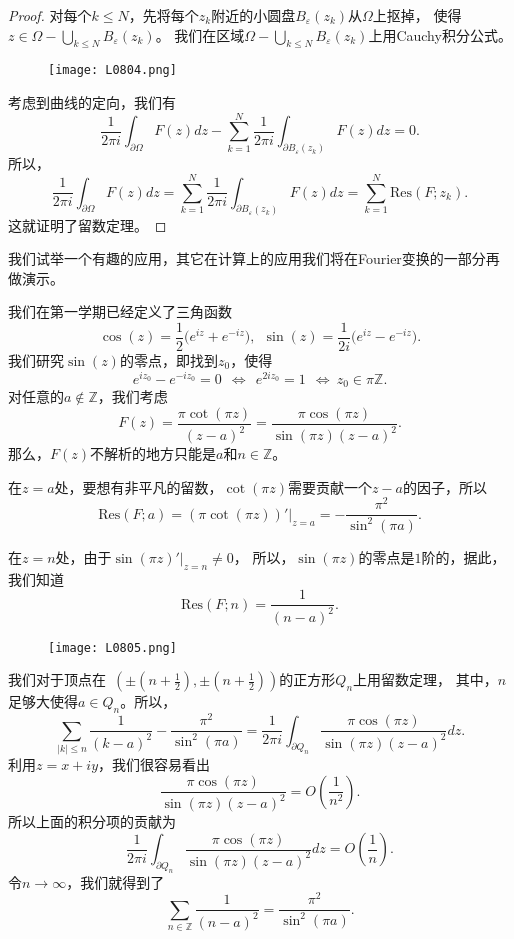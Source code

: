 \begin{proof}
对每个$k\leqslant N$，先将每个$z_k$附近的小圆盘$B_{\varepsilon}(z_k)$从$\Omega$上抠掉，
使得$z\in \Omega-\bigcup_{k\leqslant N}B_\varepsilon(z_k)$。
我们在区域$\Omega-\bigcup_{k\leqslant N}B_\varepsilon(z_k)$上用Cauchy积分公式。
\begin{figure}[H]
    \centering
    \texttt{[image: L0804.png]}
    \caption{}
\end{figure}
考虑到曲线的定向，我们有
\[\frac{1}{2\pi i}\int_{\partial \Omega} {F(z)}dz-\sum_{k=1}^N\frac{1}{2\pi i}\int_{\partial B_{\varepsilon}(z_k)} {F(z)}dz=0.
\]
所以，
\[\frac{1}{2\pi i}\int_{\partial \Omega} {F(z)}dz=\sum_{k=1}^N\frac{1}{2\pi i}\int_{\partial B_{\varepsilon}(z_k)} {F(z)}dz=\sum_{k=1}^N\textrm{Res}(F;z_k).
\]
这就证明了留数定理。
\end{proof}

我们试举一个有趣的应用，其它在计算上的应用我们将在Fourier变换的一部分再做演示。
\begin{example}
我们在第一学期已经定义了三角函数
\[\cos(z)=\frac{1}{2}\big(e^{iz}+e^{-iz}\big),\ \ \sin(z)=\frac{1}{2i}\big(e^{iz}-e^{-iz}\big).\]
我们研究$\sin(z)$的零点，即找到$z_0$，使得
\[e^{iz_0}-e^{-iz_0}=0 \ \ \Leftrightarrow \ \ e^{2iz_0}=1 \ \ \Leftrightarrow \ z_0\in \pi\mathbb{Z}.\]
对任意的$a\notin \mathbb{Z}$，我们考虑
\[F(z)=\frac{\pi\cot(\pi z)}{(z-a)^2}=\frac{\pi\cos(\pi z)}{\sin(\pi z)(z-a)^2}.\]
那么，$F(z)$不解析的地方只能是$a$和$n\in \mathbb{Z}$。

在$z=a$处，要想有非平凡的留数，$\cot(\pi z)$需要贡献一个$z-a$的因子，所以
\[\textrm{Res}(F;a)=(\pi \cot(\pi z))'|_{z=a}=-\frac{\pi^2}{\sin^2(\pi a)}.\]

在$z=n$处，由于$\sin(\pi z)'\big|_{z=n}\neq 0$，
所以，$\sin(\pi z)$的零点是$1$阶的，据此，我们知道
\[\textrm{Res}(F;n)=\frac{1}{(n-a)^2}.\]

\begin{figure}[H]
    \centering
    \texttt{[image: L0805.png]}
    \caption{}
\end{figure}
我们对于顶点在~$(\pm(n+\frac{1}{2}),\pm(n+\frac{1}{2}))$的正方形$Q_n$上用留数定理，
其中，$n$足够大使得$a\in Q_n$。所以，
\begin{equation*}
\sum_{|k|\leqslant n}\frac{1}{(k-a)^2}-\frac{\pi^2}{\sin^2(\pi a)}=\frac{1}{2\pi i}\int_{\partial Q_n} \frac{\pi\cos(\pi z)}{\sin(\pi z)(z-a)^2}dz.
\end{equation*}
利用$z=x+iy$，我们很容易看出
\[ \frac{\pi\cos(\pi z)}{\sin(\pi z)(z-a)^2}=O(\frac{1}{n^2}).\]
所以上面的积分项的贡献为
\[\frac{1}{2\pi i}\int_{\partial Q_n} \frac{\pi\cos(\pi z)}{\sin(\pi z)(z-a)^2}dz= O(\frac{1}{n}).\]
令$n\rightarrow \infty$，我们就得到了
\begin{equation*}
\sum_{n\in \mathbb{Z}}\frac{1}{(n-a)^2}=\frac{\pi^2}{\sin^2(\pi a)}.
\end{equation*}

\end{example}


